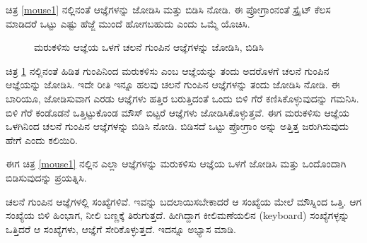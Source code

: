 \vspace{-0.5cm}
ಚಿತ್ರ \ref{mouse1} ನಲ್ಲಿನಂತೆ ಆಜ್ಞೆಗಳನ್ನು ಜೋಡಿಸಿ ಮತ್ತು ಬಿಡಿಸಿ ನೋಡಿ.  ಈ ಪ್ರೋಗ್ರಾಂನಂತೆ ಸ್ಪ್ರೈಟ್ ಕೆಲಸ ಮಾಡಿದರೆ ಒಟ್ಟು ಎಷ್ಟು ಹೆಜ್ಜೆ ಮುಂದೆ ಹೋಗಬಹುದು ಎಂದು ಒಮ್ಮೆ ಯೊಚಿಸಿ.

\begin{figure}[h]
\begin{center}
\begin{Scratch}[1.2]
\end{Scratch}
\caption{ಮರುಕಳಿಸು ಆಜ್ಞೆಯ ಒಳಗೆ ಚಲನೆ ಗುಂಪಿನ ಆಜ್ಞೆಗಳನ್ನು ಜೋಡಿಸಿ, ಬಿಡಿಸಿ}
\label{mouse2}
\end{center}
\end{figure}

ಚಿತ್ರ \ref{mouse2} ನಲ್ಲಿನಂತೆ  ಹಿಡಿತ ಗುಂಪಿನಿಂದ ಮರುಕಳಿಸು ಎಂಬ ಆಜ್ಞೆಯನ್ನು ತಂದು ಅದರೊಳಗೆ ಚಲನೆ ಗುಂಪಿನ ಆಜ್ಞೆಯನ್ನು ಜೋಡಿಸಿ.  ಇದೇ ರೀತಿ ಇನ್ನೂ ಹಲವು ಚಲನೆ ಗುಂಪಿನ ಆಜ್ಞೆಗಳನ್ನು ತಂದು  ಜೋಡಿಸಿ ನೋಡಿ. ಈ ಬಾರಿಯೂ,  ಜೋಡಿಸುವಾಗ ಎರಡು ಆಜ್ಞೆಗಳು ಹತ್ತಿರ ಬರುತ್ತಿದಂತೆ ಒಂದು ಬಿಳಿ ಗೆರೆ ಕಣಿಸಿಕೊಳ್ಳುವುದನ್ನು ಗಮನಿಸಿ.  ಬಿಳಿ ಗೆರೆ ಕಂಡೊಡನೆ ಒತ್ತಿಟ್ಟುಕೊಂಡ ಮೌಸ್ ಬಿಟ್ಟರೆ ಆಜ್ಞೆಗಳು ಜೋಡಿಸಿಕೊಳ್ಳುತ್ತವೆ.  ಈಗ ಮರುಕಳಿಸು ಆಜ್ಞೆಯ ಒಳಗಿನಿಂದ ಚಲನೆ ಗುಂಪಿನ ಆಜ್ಞೆಗಳನ್ನು ಬಿಡಿಸಿ ನೋಡಿ.  ಬಿಡಿಸದೆ ಒಟ್ಟು ಪ್ರೋಗ್ರಾಂ ಅನ್ನು ಅತ್ತಿತ್ತ ಜರುಗಿಸುವುದು ಹೇಗೆ ಎಂದು ಕಲಿಯಿರಿ. 

ಈಗ ಚಿತ್ರ \ref{mouse1} ನಲ್ಲಿನ ಎಲ್ಲಾ ಆಜ್ಞೆಗಳನ್ನು ಮರುಕಳಿಸು ಆಜ್ಞೆಯ ಒಳಗೆ ಜೋಡಿಸಿ ಮತ್ತು ಒಂದೊಂದಾಗಿ ಬಿಡಿಸುವುದನ್ನು ಪ್ರಯತ್ನಿಸಿ.

ಚಲನೆ ಗುಂಪಿನ ಆಜ್ಞೆಗಳಲ್ಲಿ ಸಂಖ್ಯೆಗಳಿವೆ. ಇವನ್ನು ಬದಲಾಯಿಸಬೇಕಾದರೆ ಆ ಸಂಖ್ಯೆಯ ಮೇಲೆ ಮೌಸ್ನಿಂದ  ಒತ್ತಿ.  ಆಗ ಸಂಖ್ಯೆಯ ಬಿಳಿ ಹಿಂಭಾಗ, ನೀಲಿ ಬಣ್ಣಕ್ಕೆ ತಿರುಗುತ್ತದೆ. ಹೀಗಿದ್ದಾಗ ಕೀಲಿಮಣೆಯಲಿನ  (\textenglish{keyboard}) ಸಂಖ್ಯೆಗಳ್ಳನ್ನು ಒತ್ತಿದರೆ ಆ ಸಂಖ್ಯೆಗಳು, ಆಜ್ಞೆಗೆ ಸೇರಿಕೊಳ್ಳುತ್ತದೆ. ಇದನ್ನೂ ಅಭ್ಯಾಸ ಮಾಡಿ. 

